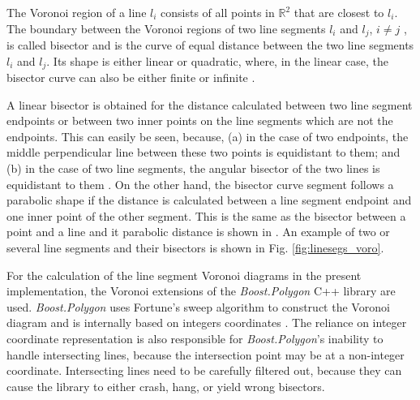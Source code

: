 The Voronoi region of a line $l_i$ consists of all points in $\mathbb{R}^2$ that are closest to $l_i$. 
The boundary between the Voronoi regions of two line segments $l_i$ and $l_j$, $i \neq j$ , 
is called bisector and is the curve of equal distance between the two line segments $l_i$ and $l_j$.
Its shape is either linear or quadratic, where, in the linear case, the bisector curve can also be either
finite or infinite \cite[pp. 243-244]{FUH_geo2020}.

A linear bisector is obtained for the distance calculated between two line segment endpoints or between two inner 
points on the line segments which are not the endpoints.
This can easily be seen, because, (a) in the case of two endpoints, the middle perpendicular line between these 
two points is equidistant to them; and (b) in the case of two line segments, the angular bisector of the two lines is
equidistant to them \cite[pp. 243-244]{FUH_geo2020}.
On the other hand, the bisector curve segment follows a parabolic shape if the distance is calculated 
between a line segment endpoint and one inner point of the other segment. This is the same as the bisector between
a point and a line and it parabolic distance is shown in \cite[pp. 260-261]{FUH_geo2020}.
An example of two or several line segments and their bisectors is shown in Fig. \ref{fig:linesegs_voro}.

For the calculation of the line segment Voronoi diagrams in the present implementation, the Voronoi extensions
\cite{web_boost_polygon_voronoi} of the \textit{Boost.Polygon} \cite{web_boost_polygon, Simonson2009} C++ library are used.
\textit{Boost.Polygon} uses Fortune's sweep algorithm \cite{Fortune1987} to construct the Voronoi diagram and is
internally based on integers coordinates \cite{web_boost_polygon}.
The reliance on integer coordinate representation is also responsible for \textit{Boost.Polygon}'s inability to handle
intersecting lines, because the intersection point may be at a non-integer coordinate. Intersecting lines need
to be carefully filtered out, because they can cause the library to either crash, hang, or yield wrong bisectors.

